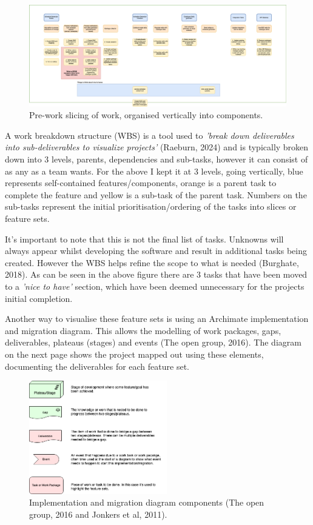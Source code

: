   \begin{figure}[H]
    \centering
    \includegraphics[width=14cm]{assets/schedulesSlicing.drawio.png}
    \caption{Pre-work slicing of work, organised vertically into components.}
    \label{fig:schedulesSlicing}
  \end{figure}

  A work breakdown structure (WBS) is a tool used to \textit{'break down deliverables into sub-deliverables to visualize projects'} (Raeburn, 2024) 
  and is typically broken down into 3 levels, parents, dependencies and sub-tasks, however it can consist of as any as a team wants. For the above I kept it 
  at 3 levels, going vertically, blue represents self-contained features/components, orange is a parent task to complete the feature and yellow is a 
  sub-task of the parent task. Numbers on the sub-tasks represent the initial prioritisation/ordering of the tasks into slices or feature sets.
  
  It's important to note that this is not the final list of tasks. Unknowns will always appear whilst developing the software and result in additional
  tasks being created. However the WBS helps refine the scope to what is needed (Burghate, 2018). As can be seen in the above figure there are 3 tasks that have 
  been moved to a \textit{'nice to have'} section, which have been deemed unnecessary for the projects initial completion.

  Another way to visualise these feature sets is using an Archimate implementation and migration diagram. This allows the modelling of work packages,
  gaps, deliverables, plateaus (stages) and events (The open group, 2016). The diagram on the next page shows the project mapped out using these elements, 
  documenting the deliverables for each feature set.

  \begin{figure}[H]
    \centering
    \includegraphics[width=6cm]{assets/migrationKey.drawio.png}
    \caption{Implementation and migration diagram components (The open group, 2016 and Jonkers et al, 2011).}
    \label{fig:migrationKey}
  \end{figure}

